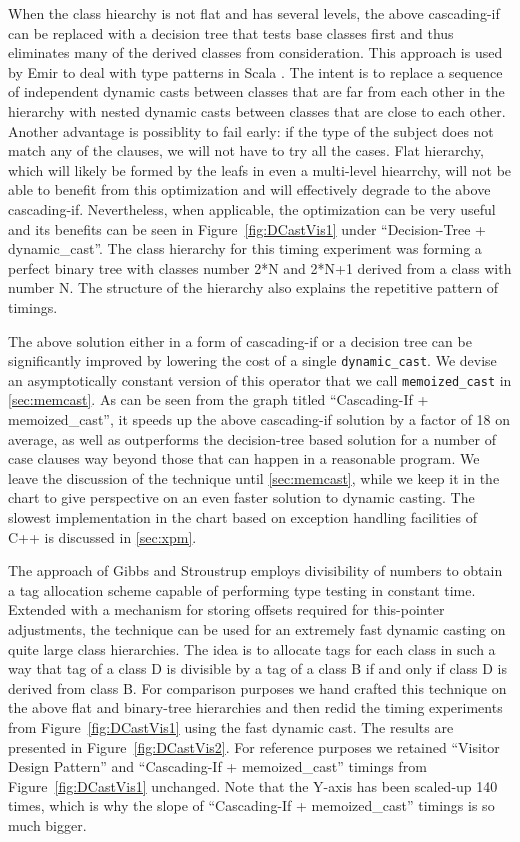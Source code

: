 \documentclass[preprint]{sigplanconf}
\makeatletter
\DeclareRobustCommand{\code}[1]{{\lstinline[breaklines=false,escapechar=@]{#1}}}
\makeatother
\begin{document}
When the class hiearchy is not flat and has several levels, the above 
cascading-if can be replaced with a decision tree that tests base classes first 
and thus eliminates many of the derived classes from consideration. This 
approach is used by Emir to deal with type patterns in Scala
\cite[]{EmirThesis}. The intent is to replace a sequence of 
independent dynamic casts between classes that are far from each other in the 
hierarchy with nested dynamic casts between classes that are close to each 
other. Another advantage is possiblity to fail early: if the type of the subject 
does not match any of the clauses, we will not have to try all the cases. 
Flat hierarchy, which will likely be formed by the leafs in even a multi-level 
hiearrchy, will not be able to benefit from this optimization and 
will effectively degrade to the above cascading-if. Nevertheless, when 
applicable, the optimization can be very useful and its benefits can be seen in
Figure~\ref{fig:DCastVis1} under ``Decision-Tree + dynamic\_cast''. The class 
hierarchy for this timing experiment was forming a perfect binary tree with 
classes number 2*N and 2*N+1 derived from a class with number N. The structure 
of the hierarchy also explains the repetitive pattern of timings.

The above solution either in a form of cascading-if or a decision tree can be 
significantly improved by lowering the cost of a single \code{dynamic_cast}. 
We devise an asymptotically constant version of this operator that we call
\code{memoized_cast} in \textsection\ref{sec:memcast}. As can be seen from the graph 
titled ``Cascading-If + memoized\_cast'', it speeds up the above cascading-if 
solution by a factor of 18 on average, as well as outperforms the decision-tree 
based solution for a number of case clauses way beyond those that can happen in 
a reasonable program. We leave the discussion of the technique until 
\textsection\ref{sec:memcast}, while we keep it in the chart to give perspective on 
an even faster solution to dynamic casting. The slowest implementation in the 
chart based on exception handling facilities of C++ is discussed in 
\textsection\ref{sec:xpm}.

The approach of Gibbs and Stroustrup employs divisibility of numbers to obtain a 
tag allocation scheme capable of performing type testing in constant time. 
Extended with a mechanism for storing offsets required for this-pointer 
adjustments, the technique can be used for an extremely fast dynamic casting on 
quite large class hierarchies\cite{FastDynCast}. The idea is to allocate tags 
for each class in such a way that tag of a class D is divisible by a tag of a 
class B if and only if class D is derived from class B. For comparison purposes 
we hand crafted this technique on the above flat and binary-tree hierarchies and 
then redid the timing experiments from Figure~\ref{fig:DCastVis1} using the fast 
dynamic cast. The results are presented in Figure~\ref{fig:DCastVis2}. For 
reference purposes we retained ``Visitor Design Pattern'' and ``Cascading-If + 
memoized\_cast'' timings from Figure~\ref{fig:DCastVis1} unchanged. Note that 
the Y-axis has been scaled-up 140 times, which is why the slope of 
``Cascading-If + memoized\_cast'' timings is so much bigger.
\end{document}
